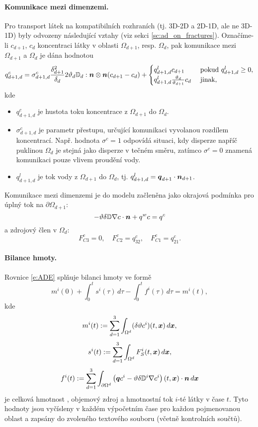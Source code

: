 \paragraph{Komunikace mezi dimenzemi.}
Pro transport látek na kompatibilních rozhraních (tj. 3D-2D a 2D-1D, ale ne 3D-1D) byly odvozeny následující vztahy (viz sekci \ref{sc:ad_on_fractures}).
Označíme-li $c_{d+1}$, $c_d$ koncentraci látky v oblasti $\Omega_{d+1}$, resp. $\Omega_d$, pak komunikace mezi $\Omega_{d+1}$ a $\Omega_d$ je dána hodnotou
\begin{equation}
  \label{e:inter_dim_flux}
  q^c_{d+1,d} = \sigma^c_{d+1,d} \frac{\delta_{d+1}^2}{\delta_d}2\vartheta_d{{\mathbb{D}}}_d:\mathbf{\boldsymbol{n}}\otimes\mathbf{\boldsymbol{n}} ( c_{d+1} - c_d)
  + \begin{cases}q^l_{d+1,d} c_{d+1} & \mbox{ pokud }q^l_{d+1,d}\ge 0,\\q^l_{d+1,d} \frac{\vartheta_d}{\vartheta_{d+1}} c_d & \mbox{ jinak},\end{cases}
\end{equation}
kde
\begin{itemize}
\item $q^c_{d+1,d}$  je hustota toku koncentrace z $\Omega_{d+1}$ do $\Omega_d$.
\item $\sigma^c_{d+1,d}$ \units{}{}{} je parametr přestupu, určující komunikaci vyvolanou rozdílem koncentrací.
Např. hodnota $\sigma^c=1$ odpovídá situaci, kdy disperze napříč puklinou $\Omega_d$ je stejná jako disperze v tečném směru, zatímco $\sigma^c=0$ znamená komunikaci pouze vlivem proudění vody.
\item $q^l_{d+1,d}$  je tok vody z $\Omega_{d+1}$ do $\Omega_d$, tj. $q^l_{d+1,d} = \mathbf{\boldsymbol{q}}_{d+1}\cdot\mathbf{\boldsymbol{n}}_{d+1}$.
\end{itemize}
Komunikace mezi dimenzemi je do modelu začleněna jako okrajová podmínka pro úplný tok na $\partial\Omega_{d+1}$:
\begin{equation}
\label{e:FC}
-\vartheta\delta{{\mathbb{D}}}\nabla c\cdot\mathbf{\boldsymbol{n}} + q^w c = q^c
\end{equation}
a zdrojový člen v $\Omega_d$:
\begin{equation}
F^c_{C3} = 0,\quad
F^c_{C2} = q^c_{32},\quad
F^c_{C1} = q^c_{21}.
\end{equation}



\paragraph{Bilance hmoty.}
Rovnice \eqref{e:ADE} splňuje bilanci hmoty ve formě
$$ m^i(0) + \int_0^t s^i(\tau) \,d\tau - \int_0^t f^i(\tau) \,d\tau = m^i(t), $$
kde
$$ m^i(t) := \sum_{d=1}^3\int_{\Omega^d}(\delta\vartheta c^i)(t,\mathbf{\boldsymbol{x}})\,d\mathbf{\boldsymbol{x}}, $$
$$ s^i(t) := \sum_{d=1}^3\int_{\Omega^d}F_S^i(t,\mathbf{\boldsymbol{x}})\,d\mathbf{\boldsymbol{x}}, $$
$$ f^i(t) := \sum_{d=1}^3\int_{\partial\Omega^d}\left(\mathbf{\boldsymbol{q}} c^i - \vartheta\delta{{\mathbb{D}}}^i\nabla c^i\right)(t,\mathbf{\boldsymbol{x}})\cdot\mathbf{\boldsymbol{n}} \,d\mathbf{\boldsymbol{x}} $$
je celková hmotnost , objemový zdroj  a hmotnostní tok  $i$-té látky v čase $t$.
Tyto hodnoty jsou vyčísleny v každém výpočetním čase pro každou pojmenovanou oblast a zapsány do zvoleného textového souboru (včetně kontrolních součtů).





